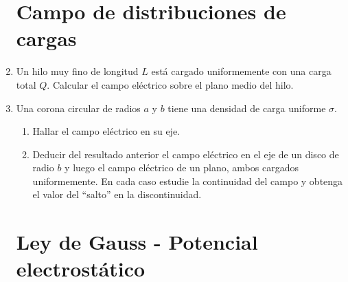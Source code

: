 \documentclass[11pt,spanish,a4paper]{article}
\begin{document}
\begin{enumerate}
\section*{Campo de distribuciones de cargas}

\item Un hilo muy fino de longitud \(L\) está cargado uniformemente con una carga total \(Q\).
Calcular el campo eléctrico sobre el plano medio del hilo.


\item Una corona circular de radios \(a\) y \(b\) tiene una densidad de carga uniforme \(\sigma\).
\begin{enumerate}
  \item Hallar el campo eléctrico en su eje.
  \item Deducir del resultado anterior el campo eléctrico en el eje de un disco de radio \(b\) y luego el campo eléctrico de un plano, ambos cargados uniformemente.
En cada caso estudie la continuidad del campo y obtenga el valor del ``salto'' en la discontinuidad.
\end{enumerate}


\section*{Ley de Gauss - Potencial electrostático}


\end{enumerate}
\end{document}
